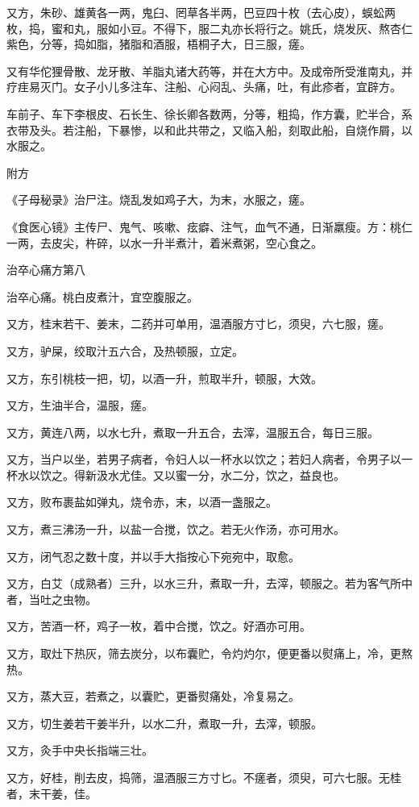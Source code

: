 \documentclass[12pt,UTF8]{ctexbook}
\begin{document}
又方，朱砂、雄黄各一两，鬼臼、罔草各半两，巴豆四十枚（去心皮），蜈蚣两枚，捣，蜜和丸，服如小豆。不得下，服二丸亦长将行之。姚氏，烧发灰、熬杏仁紫色，分等，捣如脂，猪脂和酒服，梧桐子大，日三服，瘥。

又有华佗狸骨散、龙牙散、羊脂丸诸大药等，并在大方中。及成帝所受淮南丸，并疗疰易灭门。女子小儿多注车、注船、心闷乱、头痛，吐，有此疹者，宜辟方。

车前子、车下李根皮、石长生、徐长卿各数两，分等，粗捣，作方囊，贮半合，系衣带及头。若注船，下暴惨，以和此共带之，又临入船，刻取此船，自烧作屑，以水服之。

附方

《子母秘录》治尸注。烧乱发如鸡子大，为末，水服之，瘥。

《食医心镜》主传尸、鬼气、咳嗽、痃癖、注气，血气不通，日渐羸瘦。方：桃仁一两，去皮尖，杵碎，以水一升半煮汁，着米煮粥，空心食之。

治卒心痛方第八

治卒心痛。桃白皮煮汁，宜空腹服之。

又方，桂末若干、姜末，二药并可单用，温酒服方寸匕，须臾，六七服，瘥。

又方，驴屎，绞取汁五六合，及热顿服，立定。

又方，东引桃枝一把，切，以酒一升，煎取半升，顿服，大效。

又方，生油半合，温服，瘥。

又方，黄连八两，以水七升，煮取一升五合，去滓，温服五合，每日三服。

又方，当户以坐，若男子病者，令妇人以一杯水以饮之；若妇人病者，令男子以一杯水以饮之。得新汲水尤佳。又以蜜一分，水二分，饮之，益良也。

又方，败布裹盐如弹丸，烧令赤，末，以酒一盏服之。

又方，煮三沸汤一升，以盐一合搅，饮之。若无火作汤，亦可用水。

又方，闭气忍之数十度，并以手大指按心下宛宛中，取愈。

又方，白艾（成熟者）三升，以水三升，煮取一升，去滓，顿服之。若为客气所中者，当吐之虫物。

又方，苦酒一杯，鸡子一枚，着中合搅，饮之。好酒亦可用。

又方，取灶下热灰，筛去炭分，以布囊贮，令灼灼尔，便更番以熨痛上，冷，更熬热。

又方，蒸大豆，若煮之，以囊贮，更番熨痛处，冷复易之。

又方，切生姜若干姜半升，以水二升，煮取一升，去滓，顿服。

又方，灸手中央长指端三壮。

又方，好桂，削去皮，捣筛，温酒服三方寸匕。不瘥者，须臾，可六七服。无桂者，末干姜，佳。
\end{document}

